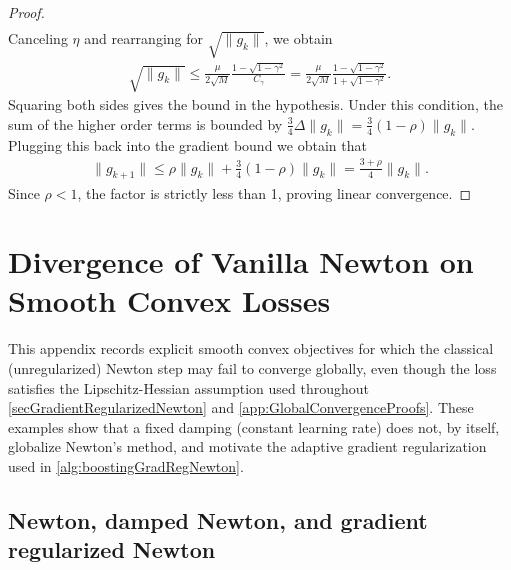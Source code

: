 \documentclass{article}
\theoremstyle{plain}
\theoremstyle{definition}
\theoremstyle{remark}
\begin{document}
\begin{proof}
\begin{align}
    \end{align}
    Canceling $\eta$ and rearranging for $\sqrt{\|g_k\|}$, we obtain
    \begin{align}
        \sqrt{\|g_k\|} \leq \frac{\mu}{2\sqrt{M}} \frac{1 - \sqrt{1-\gamma^2}}{C_\gamma} = \frac{\mu}{2\sqrt{M}} \frac{1 - \sqrt{1-\gamma^2}}{1 + \sqrt{1-\gamma^2}}.
    \end{align}
    Squaring both sides gives the bound in the hypothesis. Under this condition, the sum of the higher order terms is bounded by $\frac{3}{4}\Delta \|g_k\| = \frac{3}{4}(1-\rho)\|g_k\|$. Plugging this back into the gradient bound we obtain that
    \begin{align}
        \|g_{k+1}\| \leq \rho \|g_k\| + \frac{3}{4}(1-\rho)\|g_k\| = \frac{3+\rho}{4}\|g_k\|.
    \end{align}
    Since $\rho < 1$, the factor is strictly less than 1, proving linear convergence.
\end{proof}











\clearpage
\section{Divergence of Vanilla Newton on Smooth Convex Losses}\label{app:newton_divergence}
This appendix records explicit smooth convex objectives for which the classical
(unregularized) Newton step may fail to converge globally, even though the loss
satisfies the Lipschitz-Hessian assumption used throughout \cref{secGradientRegularizedNewton} and
\cref{app:GlobalConvergenceProofs}. These examples show that a fixed damping (constant learning rate)
does not, by itself, globalize Newton's method, and motivate the adaptive
gradient regularization used in \cref{alg:boostingGradRegNewton}.



\subsection{Newton, damped Newton, and gradient regularized Newton}
\end{document}
